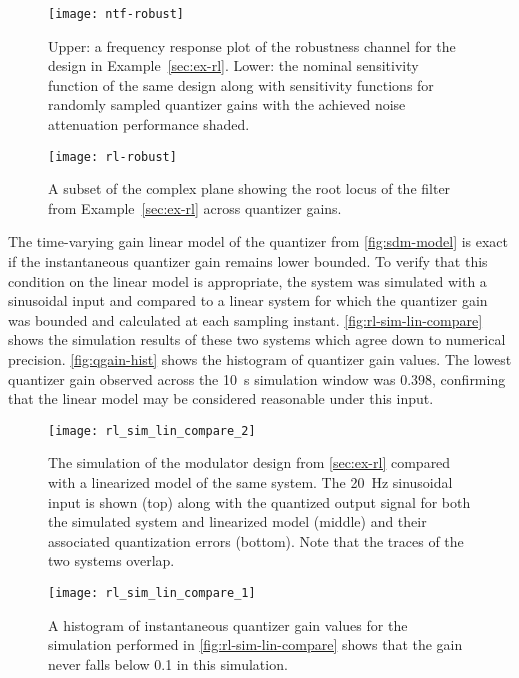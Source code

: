 \begin{figure}
	\centering
	\texttt{[image: ntf-robust]}
	\caption{Upper: a frequency response plot of the robustness channel for the design in Example~\ref{sec:ex-rl}. Lower: the nominal sensitivity function of the same design along with sensitivity functions for randomly sampled quantizer gains with the achieved noise attenuation performance shaded.} \label{fig:ntf-rl}
\end{figure}

\begin{figure}
	\centering
	\texttt{[image: rl-robust]}
	\caption{A subset of the complex plane showing the root locus of the filter from Example~\ref{sec:ex-rl} across quantizer gains.} \label{fig:rl-rl}
\end{figure}

The time-varying gain linear model of the quantizer from \autoref{fig:sdm-model} is exact if the instantaneous quantizer gain remains lower bounded. To verify that this condition on the linear model is appropriate, the system was simulated with a sinusoidal input and compared to a linear system for which the quantizer gain was bounded and calculated at each sampling instant. \autoref{fig:rl-sim-lin-compare} shows the simulation results of these two systems which agree down to numerical precision. \autoref{fig:qgain-hist} shows the histogram of quantizer gain values. The lowest quantizer gain observed across the \SI{10}{\second} simulation window was 0.398, confirming that the linear model may be considered reasonable under this input.

\begin{figure}
	\centering
	\texttt{[image: rl\_sim\_lin\_compare\_2]}
	\caption{The simulation of the modulator design from \autoref{sec:ex-rl} compared with a linearized model of the same system. The \SI{20}{\hertz} sinusoidal input is shown (top) along with the quantized output signal for both the simulated system and linearized model (middle) and their associated quantization errors (bottom). Note that the traces of the two systems overlap.} \label{fig:rl-sim-lin-compare}
\end{figure}

\begin{figure}
	\centering
	\texttt{[image: rl\_sim\_lin\_compare\_1]}
	\caption{A histogram of instantaneous quantizer gain values for the simulation performed in \autoref{fig:rl-sim-lin-compare} shows that the gain never falls below 0.1 in this simulation.} \label{fig:qgain-hist}
\end{figure}

